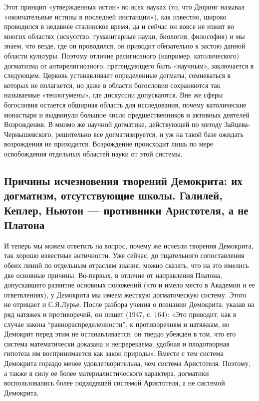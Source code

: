 Этот  принцип «утвержденных  истин»  во всех  науках  (то, что  Дюринг
называл «окончательные  истины в последней инстанции»),  как известно,
широко  проводился  в  недавнее  сталинское  время,  да  и  сейчас  он
вовсе  не изжит  во  многих областях  (искусство, гуманитарные  науки,
биология,  философия) и  мы знаем,  что везде,  где он  проводился, он
приводит обязательно к застою данной области культуры. Поэтому отличие
религиозного (например, католического) догматизма от антирелигиозного,
претендующего  быть   «научным»,  заключается  в   следующем.  Церковь
устанавливает   определенные  догматы,   сомневаться   в  которых   не
полагается, но  даже в  области богословия сохраняются  так называемые
«теологумены»,  где дискуссии  допускаются.  Вне  же сферы  богословия
остается  обширная  область   для  исследования,  почему  католические
монастыри  и  выдвинули  большое  число  предшественников  и  активных
деятелей  Возрождения. В  мнимо же  научной догматике,  действующей по
методу Зайцева-Чернышевского, решительно все  догматизируется, и уж на
такой базе  ожидать возрождения не приходится.  Возрождение происходит
лишь по мере освобождения отдельных областей науки от этой системы.

\subsection{Причины  исчезновения  творений Демокрита:  их  догматизм,
отсутствующие   школы.   Галилей,   Кеплер,  Ньютон   ---   противники
Аристотеля, а не Платона}

И  теперь мы  можем ответить  на  вопрос, почему  же исчезли  творения
Демокрита, так хорошо известные античности. Уже сейчас, до тщательного
сопоставления обеих линий по отдельным отраслям знания, можно сказать,
что  на  это  имелись  две  основные  причины.  Во-первых,  в  отличие
от  направления  Платона,  допускавшего  развитие  основных  положений
(что  и имело  место в  Академии и  ее ответвлениях),  у Демокрита  мы
имеем жесткую  догматическую систему.  Этого не отрицает  и С.Я.Лурье.
После разбора  учения о  познании Демокрита, указав  на ряд  натяжек и
противоречий, он  пишет (1947,  с. 164): «Это  приводит, как  в случае
закона  ``равнораспределенности'',  к  противоречиям  и  натяжкам,  но
Демокрит  перед этим  не  останавливается: он  твердо  убежден в  том,
что  его  система математически  доказана  и  непререкаема; удобная  и
плодотворная гипотеза  им воспринимается как закон  природы». Вместе с
тем  система Демокрита  гораздо менее  удовлетворительна, чем  система
Аристотеля.  Поэтому,  а также  в  силу  ее более  материалистического
характера,   догматики  воспользовались   более  подходящей   системой
Аристотеля, а не системой Демокрита.

